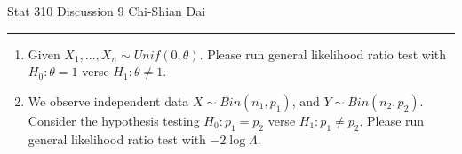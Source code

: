 \documentclass[12pt]{article}
\begin{document}
	\noindent Stat 310 \hfill  Discussion 9 \hfill Chi-Shian Dai
\smallskip
	\hrule
\begin{enumerate}
\item Given $X_1,\dots, X_n \sim Unif(0,\theta)$. Please run general likelihood ratio test with $H_0:\theta=1$ verse $H_1: \theta\ne 1.$

\vspace{8 cm}
\item We observe independent data $X\sim Bin(n_1,p_1)$, and $Y\sim Bin(n_2,p_2)$. Consider the hypothesis testing $H_0:p_1=p_2$ verse $H_1: p_1\ne p_2.$
Please  run general likelihood ratio test with $-2\log\Lambda$.
\end{enumerate}
\end{document}
